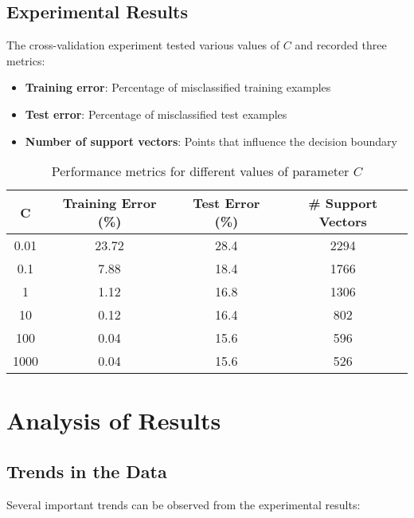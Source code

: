 \documentclass{article}
\begin{document}
\subsection{Experimental Results}
The cross-validation experiment tested various values of $C$ and recorded three metrics:

\begin{itemize}
    \item \textbf{Training error}: Percentage of misclassified training examples
    \item \textbf{Test error}: Percentage of misclassified test examples
    \item \textbf{Number of support vectors}: Points that influence the decision boundary
\end{itemize}

\begin{table}[h]
\centering
\begin{tabular}{|c|c|c|c|}
\hline
\textbf{C} & \textbf{Training Error (\%)} & \textbf{Test Error (\%)} & \textbf{\# Support Vectors} \\
\hline
0.01 & 23.72 & 28.4 & 2294 \\
0.1 & 7.88 & 18.4 & 1766 \\
1 & 1.12 & 16.8 & 1306 \\
10 & 0.12 & 16.4 & 802 \\
100 & 0.04 & 15.6 & 596 \\
1000 & 0.04 & 15.6 & 526 \\
\hline
\end{tabular}
\caption{Performance metrics for different values of parameter $C$}
\end{table}

\section{Analysis of Results}

\subsection{Trends in the Data}
Several important trends can be observed from the experimental results:
\end{document}
